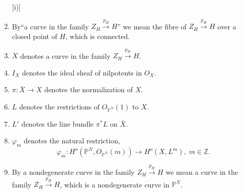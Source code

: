 \begin{enumerate} [i)]
\item By\pageoriginale ``a curve in the family $Z_H \xrightarrow{p_H}
  H$'' we mean 
  the fibre of $Z_H \xrightarrow{p_H} H$ over a closed point of $H$,
  which is connected. 

\item $X$ denotes a curve in the family $Z_H \xrightarrow{p_H} H$.

\item $I_X$ denotes the ideal sheaf of nilpotents in $O_X$.\label{c1:nilpotents}

\item $\pi : \bar{X} \to X $ denotes the normalization of $X$.

\item $L$ denotes the restrictions of $ O_{\mathbb{P}^N} (1)$ to $X$.

\item $L'$ denotes the line bundle $\pi^* L$ on $\bar{X}$.

\item $\varphi_m$ denotes the natural restriction, 
$$
\varphi_m : H^o (\mathbb{P}^N, O_{\mathbb{P}^N} (m)) \to H^o 
(X, L^m), \; m \in \mathbb{Z}.
$$
  
\item By a nondegenerate curve in the family  $Z_H \xrightarrow{p_H}
  H$ we mean a curve in the family $Z_H \xrightarrow{p_H} H$, which is
  a nondegenerate curve in $\mathbb{P}^N$. 
\end{enumerate}

